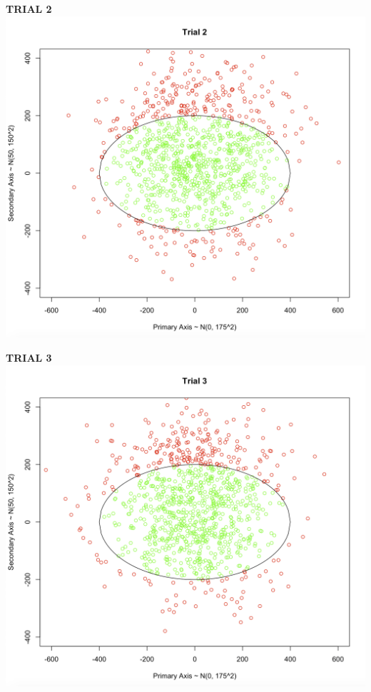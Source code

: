 \documentclass[svgnames]{article}
\begin{document}
\textbf{TRIAL 2}
\newline
\includegraphics[scale=.30]{trial2}

\textbf{TRIAL 3}
\newline
\includegraphics[scale=.35]{trial3}
\end{document}
